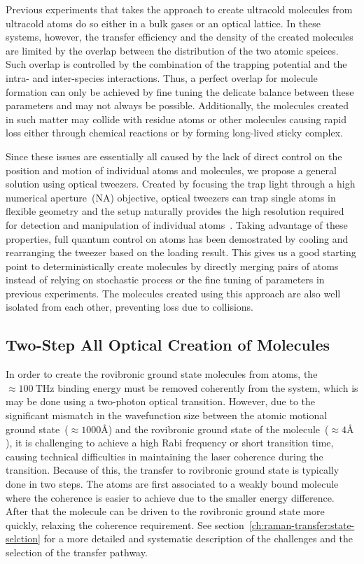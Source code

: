 Previous experiments that takes the approach to create ultracold molecules
from ultracold atoms do so either in a bulk gases or an optical lattice.
In these systems, however, the transfer efficiency and
the density of the created molecules are limited
by the overlap between the distribution of the two atomic speices.
Such overlap is controlled by the combination of the trapping potential
and the intra- and inter-species interactions.
Thus, a perfect overlap for molecule formation can only be achieved by fine tuning
the delicate balance between these parameters and may not always be possible.
Additionally, the molecules created in such matter may collide
with residue atoms or other molecules causing rapid loss
either through chemical reactions or by forming long-lived sticky complex.

Since these issues are essentially all caused by the lack of direct control
on the position and motion of individual atoms and molecules,
we propose a general solution using optical tweezers.
Created by focusing the trap light through a high numerical aperture~(NA) objective,
optical tweezers can trap single atoms in flexible geometry
and the setup naturally provides the high resolution required
for detection and manipulation of individual atoms~\cite{schlosser_sub-poissonian_2001}.
Taking advantage of these properties, full quantum control on atoms has been demostrated
by cooling and rearranging the tweezer based on the loading result.
This gives us a good starting point to deterministically create molecules
by directly merging pairs of atoms instead of
relying on stochastic process or the fine tuning of parameters in previous experiments.
The molecules created using this approach are also well isolated from each other,
preventing loss due to collisions.

\subsection{Two-Step All Optical Creation of Molecules}
\label{ch:introduction:tweezers:two-step}

In order to create the rovibronic ground state molecules from atoms,
the $\approx100~\mathrm{THz}$ binding energy must be removed coherently from the system,
which is may be done using a two-photon optical transition.
However, due to the significant mismatch in the wavefunction size
between the atomic motional ground state~($\approx1000\text{\AA}$)
and the rovibronic ground state of the molecule~($\approx4\text{\AA}$),
it is challenging to achieve a high Rabi frequency or short transition time,
causing technical difficulties in maintaining the laser coherence during the transition.
Because of this, the transfer to rovibronic ground state is typically done in two steps.
The atoms are first associated to a weakly bound molecule
where the coherence is easier to achieve due to the smaller energy difference.
After that the molecule can be driven to the rovibronic ground state more quickly,
relaxing the coherence requirement. See section~\ref{ch:raman-transfer:state-selction}
for a more detailed and systematic description of the challenges
and the selection of the transfer pathway.

